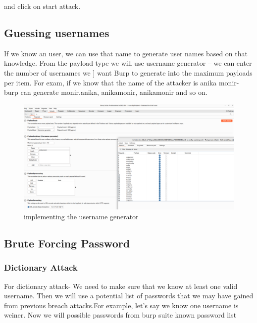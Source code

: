 \documentclass[
	a4paper, %
	12pt, %
]{CSSullivanBusinessReport}
\begin{document}
\begin{fullwidth}
 

and click on start attack.


\subsection*{Guessing usernames}

\begin{fullwidth}If we know an user, we can use that name to generate user names based on that knowledge. From the payload type we will use username generator – we can enter the number of usernames we ] want Burp to generate into the maximum payloads per item. For exam, if we know that the name of the attacker is anika monir- burp can generate monir.anika, anikamonir,  anika\textunderscore monir and so on.
\end{fullwidth}

\begin{figure}[H]
    \centering
    \includegraphics[width=1\textwidth]{Images/anikaScreensots/username.png}
    \caption{implementing the username generator}
    \label{fig:enter-label}
\end{figure}

\subsection*{Brute Forcing Password}
\subsubsection*{Dictionary Attack}
\begin{fullwidth}
    For dictionary attack- We need to make sure that we know at least one valid username. Then we will use a potential list of passwords that we may have gained from previous breach attacks.For example, let’s say we know one username is weiner. Now we will possible passwords from burp suite known password list


\end{fullwidth}
\end{fullwidth}
\end{document}
